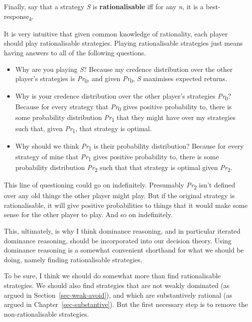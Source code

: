 \documentclass[
  12pt,
  letterpaper,
  DIV=11,
  numbers=noendperiod]{scrreprt}
\providecommand{\tightlist}{%
  \setlength{\itemsep}{0pt}\setlength{\parskip}{0pt}}\usepackage{longtable,booktabs,array}
\begin{document}
Finally, say that a strategy \emph{S} is \textbf{rationalisable} iff for
any \emph{n}, it is a best-response\textsubscript{\emph{k}}.

It is very intuitive that given common knowledge of rationality, each
player should play rationalisable strategies. Playing rationalisable
strategies just means having answers to all of the following questions.

\begin{itemize}
\tightlist
\item
  Why are you playing \emph{S}? Because my credence distribution over
  the other player's strategies is \emph{Pr}\textsubscript{0}, and given
  \emph{Pr}\textsubscript{0}, \emph{S} maximises expected returns.
\item
  Why is your credence distribution over the other player's strategies
  \emph{Pr}\textsubscript{0}? Because for every strategy that
  \emph{Pr}\textsubscript{0} gives positive probability to, there is
  some probability distribution \emph{Pr}\textsubscript{1} that they
  might have over my strategies such that, given
  \emph{Pr}\textsubscript{1}, that strategy is optimal.
\item
  Why should we think \emph{Pr}\textsubscript{1} is their probability
  distribution? Because for every strategy of mine that
  \emph{Pr}\textsubscript{1} gives positive probability to, there is
  some probability distribution \emph{Pr}\textsubscript{2} such that
  that strategy is optimal given \emph{Pr}\textsubscript{2}.
\end{itemize}

This line of questioning could go on indefinitely. Presumably
\emph{Pr}\textsubscript{2} isn't defined over any old things the other
player might play. But if the original strategy is rationalisable, it
will give positive probabilities to things that it would make some sense
for the other player to play. And so on indefinitely.

This, ultimately, is why I think dominance reasoning, and in particular
iterated dominance reasoning, should be incorporated into our decision
theory. Using dominance reasoning is a somewhat convenient shorthand for
what we should be doing, namely finding rationalisable strategies.

To be sure, I think we should do somewhat more than find rationalisable
strategies. We should also find strategies that are not weakly dominated
(as argued in Section~\ref{sec-weak-avoid}), and which are substantively
rational (as argued in Chapter~\ref{sec-substantive}). But the first
necessary step is to remove the non-rationalisable strategies.
\end{document}
